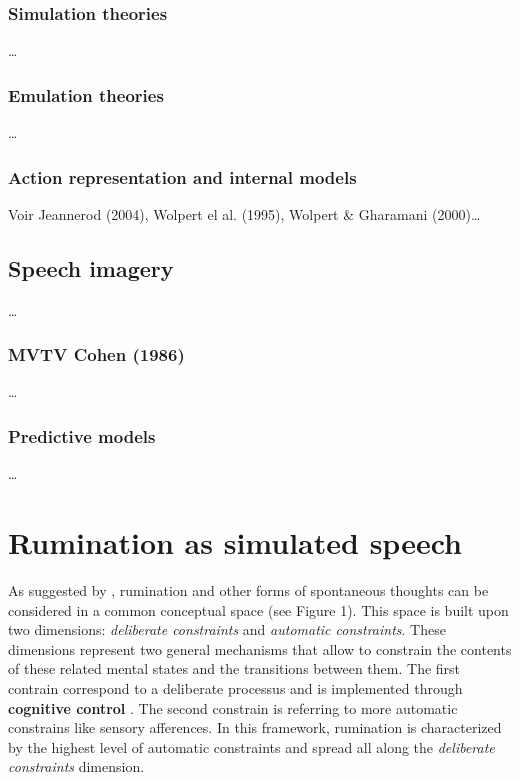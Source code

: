 \documentclass[12pt,]{book}
\begin{document}
\subsection{Simulation theories}\label{simulation-theories}

\ldots{}

\subsection{Emulation theories}\label{emulation-theories}

\ldots{}

\subsection{Action representation and internal
models}\label{action-representation-and-internal-models}

Voir Jeannerod (2004), Wolpert el al. (1995), Wolpert \& Gharamani
(2000)\ldots{}

\section{Speech imagery}\label{speech-imagery}

\ldots{}

\subsection{MVTV Cohen (1986)}\label{mvtv-cohen-1986}

\ldots{}

\subsection{Predictive models}\label{predictive-models}

\ldots{}

\chapter{Rumination as simulated
speech}\label{rumination-as-simulated-speech}

As suggested by \citet{Christoff2016}, rumination and other forms of
spontaneous thoughts can be considered in a common conceptual space (see
Figure 1). This space is built upon two dimensions: \emph{deliberate
constraints} and \emph{automatic constraints}. These dimensions
represent two general mechanisms that allow to constrain the contents of
these related mental states and the transitions between them. The first
contrain correspond to a deliberate processus and is implemented through
\textbf{cognitive control} \citep{Miller2000}. The second constrain is
referring to more automatic constrains like sensory afferences. In this
framework, rumination is characterized by the highest level of automatic
constraints and spread all along the \emph{deliberate constraints}
dimension.
\end{document}
